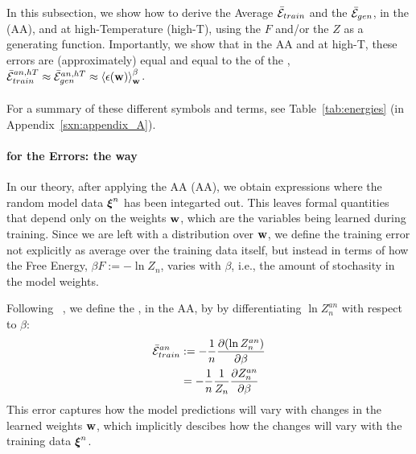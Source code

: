 {

In this subsection, we show how to derive the Average \TrainingError $\bar{\mathcal{E}}_{train}$ and  the \AverageGeneralizationError $\bar{\mathcal{E}}_{gen}$,
in the \AnnealedApproximation (AA), and at high-Temperature (high-T), using the \FreeEnergy $F$ and/or the \PartitionFunction $Z$ as
a generating function.  Importantly, we show that in the AA and at high-T, these errors are (approximately) equal
and equal to the \ThermalAverage of the \EffectivePotential,
$\bar{\mathcal{E}}_{train}^{an, hT} \approx \bar{\mathcal{E}}_{gen}^{an, hT} \approx \left\langle \epsilon({\mathbf{w}}) \right\rangle_{\mathbf w}^{\beta}$.
\\
\\
For a summary of these different symbols and terms, see Table~\ref{tab:energies} (in Appendix~\ref{sxn:appendix_A}).

\paragraph{\GeneratingFunctions for the Errors: the \STATMECH way}

In our theory, after applying the AA (AA), we obtain expressions where the
random model data $\boldsymbol{\xi}^{n}$ has been integarted out. This leaves formal quantities
that depend only on the weights ${\mathbf{w}}$, which are the variables being learned during training.
Since we are left with a distribution over ${\mathbf{w}}$,
we define the training error not explicitly as average over the training data itself,
but instead in terms of how the Free Energy,  $\beta F :=-\ln Z_{n}$,
varies  with $\beta$, i.e., the amount of stochasity in the model weights.

Following ~\cite{LTS90, Solla2023},
we define the \emph{\AverageTrainingError}, in the AA,
by by differentiating $\ln Z^{an}_{n}$ with respect to $\beta$:
\begin{align}
  \label{eqn:avgte_def}
  \bar{\mathcal{E}}_{train}^{an}
  & := -\frac{1}{n}\dfrac{\partial (\ln Z^{an}_{n})}{\partial \beta} \\ \nonumber
  &  = -\frac{1}{n}\frac{1}{Z_{n}}\dfrac{\partial Z^{an}_{n}}{\partial \beta} 
\end{align}
This error captures how the model predictions will vary with changes in the learned
weights ${\mathbf{w}}$, which implicitly descibes how the changes will vary with the
training data $\boldsymbol{\xi}^{n}$.

}
